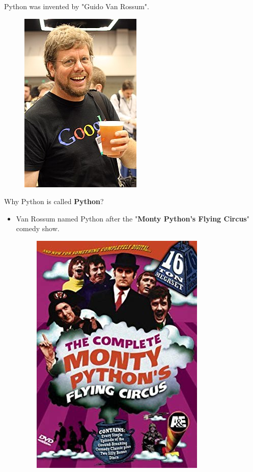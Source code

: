 
\begin{flushleft}
	
	\bigskip
	
	
	Python was invented by "Guido Van Rossum".
	\begin{figure}[h!]
		\centering
		\includegraphics[scale=.45]{content/chapter0/images/python.jpg}
	\end{figure}

	Why Python is called \textbf{Python}?	
	\begin{itemize}
		\item Van Rossum named Python after the "\textbf{Monty Python's Flying Circus}" comedy show.
		\begin{figure}[h!]
			\centering
			\includegraphics[scale=.45]{content/chapter0/images/monty.png}
		\end{figure}
	\end{itemize}
	

\end{flushleft}
